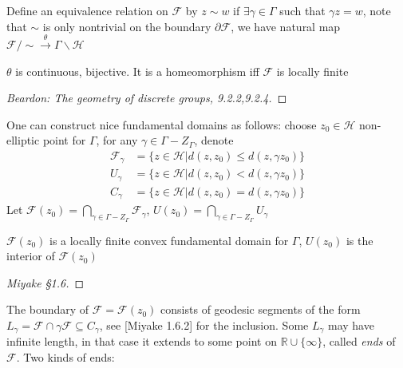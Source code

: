 \documentclass[main]{subfiles}
\begin{document}
Define an equivalence relation on $\mathcal F$ by $z\sim w$ if $\exists\gamma\in\Gamma$ such that $\gamma z=w$, note that $\sim$ is only nontrivial on the boundary $\partial \mathcal F$, we have natural map $\mathcal F/\sim\xrightarrow{\theta}\Gamma\backslash\mathcal H$

\begin{proposition}
$\theta$ is continuous, bijective. It is a homeomorphism iff $\mathcal F$ is locally finite
\end{proposition}

\begin{proof}
[Beardon: The geometry of discrete groups, 9.2.2,9.2.4]
\end{proof}

One can construct nice fundamental domains as follows: choose $z_0\in\mathcal H$ non-elliptic point for $\Gamma$, for any $\gamma\in\Gamma-Z_\Gamma$, denote
\begin{align*}
\mathcal F_\gamma&=\{z\in\mathcal H|d(z,z_0)\leq d(z,\gamma z_0)\} \\
U_\gamma&=\{z\in\mathcal H|d(z,z_0)< d(z,\gamma z_0)\} \\
C_\gamma&=\{z\in\mathcal H|d(z,z_0)= d(z,\gamma z_0)\}
\end{align*}
Let $\mathcal F(z_0)=\bigcap_{\gamma\in\Gamma-Z_\Gamma}\mathcal F_\gamma$, $U(z_0)=\bigcap_{\gamma\in\Gamma-Z_\Gamma}U_\gamma$

\begin{proposition}
$\mathcal F(z_0)$ is a locally finite convex fundamental domain for $\Gamma$, $U(z_0)$ is the interior of $\mathcal F(z_0)$
\end{proposition}

\begin{proof}
[Miyake \S 1.6]
\end{proof}

The boundary of $\mathcal F=\mathcal F(z_0)$ consists of geodesic segments of the form $L_\gamma=\mathcal F\cap\gamma \mathcal F\subseteq C_\gamma$, see [Miyake 1.6.2] for the inclusion. Some 
$L_\gamma$ may have infinite length, in that case it extends to some point on $\mathbb R\cup\{\infty\}$, called \textit{ends} of $\mathcal F$. Two kinds of ends:
\begin{center}
\end{center}
\begin{center}
\end{center}
\end{document}
